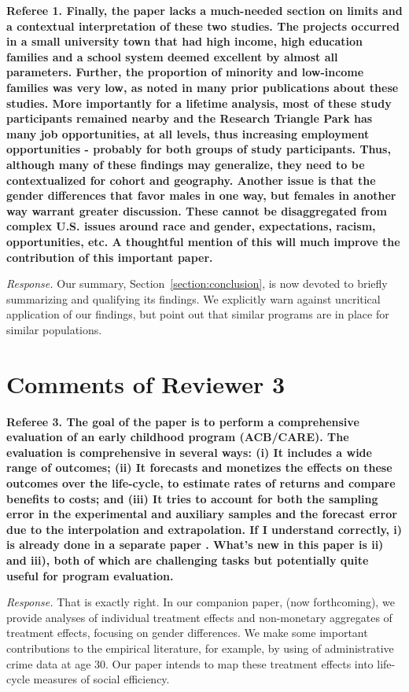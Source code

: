 \noindent \textbf{Referee 1. Finally, the paper lacks a much-needed section on limits and a contextual interpretation of these two studies. The projects occurred in a small university town that had high income, high education families and a school system deemed excellent by almost all parameters. Further, the proportion of minority and low-income families was very low, as noted in many prior publications about these studies. More importantly for a lifetime analysis, most of these study participants remained nearby and the Research Triangle Park has many job opportunities, at all levels, thus increasing employment opportunities - probably for both groups of study participants. Thus, although many of these findings may generalize, they need to be contextualized for cohort and geography. Another issue is that the gender differences that favor males in one way, but females in another way warrant greater discussion. These cannot be disaggregated from complex U.S. issues around race and gender, expectations, racism, opportunities, etc. A thoughtful mention of this will much improve the contribution of this important paper.}

\noindent \textit{Response.} Our summary, Section~\ref{section:conclusion}, is now devoted to briefly summarizing and qualifying its findings. We explicitly warn against uncritical application of our findings, but point out that similar programs are in place for similar populations.

\section*{Comments of Reviewer 3}

\noindent \textbf{Referee 3. The goal of the paper is to perform a comprehensive evaluation of an early childhood program (ACB/CARE). The evaluation is comprehensive in several ways: (i) It includes a wide range of outcomes; (ii) It forecasts and monetizes the effects on these outcomes over the life-cycle, to estimate rates of returns and compare benefits to costs; and (iii) It tries to account for both the sampling error in the experimental and auxiliary samples and the forecast error due to the interpolation and extrapolation. If I understand correctly, i) is already done in a separate paper \citet{Garcia_Heckman_Ziff_2017_Gender-Diff_UNPUBLISHED}. What's new in this paper is ii) and iii), both of which are challenging tasks but potentially quite useful for program evaluation.}

\noindent \textit{Response.} That is exactly right. In our companion paper, \citet{Garcia_Heckman_Ziff_2017_Gender-Diff_UNPUBLISHED} (now \citet{Garcia_Heckman_Ziff_2018_EER} forthcoming), we provide analyses of individual treatment effects and non-monetary aggregates of treatment effects, focusing on gender differences. We make some important contributions to the empirical literature, for example, by using of administrative crime data at age 30. Our paper intends to map these treatment effects into life-cycle measures of social efficiency.

